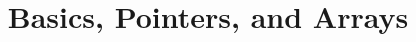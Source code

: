 \documentclass{article}
\title{Basics, Pointers, and Arrays}
\author{}
\date{}
\begin{document}
\maketitle

\section{}
\end{document}
